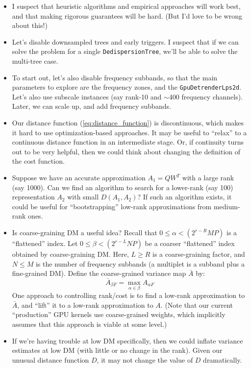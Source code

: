 \documentclass{article}
\numberwithin{equation}{section}   %
\begin{document}
\begin{itemize}

\item I suspect that heuristic algorithms and empirical approaches will
 work best, and that making rigorous guarantees will be hard. (But I'd love to
 be wrong about this!)

\item Let's disable downsampled trees and early triggers. I suspect that
 if we can solve the problem for a single {\tt DedispersionTree}, we'll
 be able to solve the multi-tree case.

\item To start out, let's also disable frequency subbands, so that the
 main parameters to explore are the frequency zones, and the {\tt GpuDetrenderLps2d}.
 Let's also use subscale instances (say rank-10 and $\sim$400 frequency channels).
 Later, we can scale up, and add frequency subbands.

\item Our distance function (\ref{eq:distance_function}) is discontinuous,
 which makes it hard to use optimization-based approaches. It may be useful to
 ``relax'' to a continuous distance function in an intermediate stage. Or, if
 continuity turns out to be very helpful, then we could think about changing
 the definition of the cost function.

\item Suppose we have an accurate approximation $A_1 = Q W^T$ with
 a large rank (say 1000). Can we find an algorithm to search for a lower-rank
 (say 100) representation $A_2$ with small $D(A_1,A_2)$? If such an algorithm
 exists, it could be useful for ``bootstrapping'' low-rank approximations from
 medium-rank ones.

\item Is coarse-graining DM a useful idea? Recall that $0 \le \alpha < (2^{r-R}MP)$
is a ``flattened'' index. Let $0\le \beta < (2^{r-L}NP)$ be a coarser ``flattened''
index obtained by coarse-graining DM. Here, $L \ge R$ is a coarse-graining factor, 
and $N \le M$ is the number of frequency subbands (a multiplet is a subband plus
a fine-grained DM). Define the coarse-grained variance map $\bar A$ by:
\begin{equation}
\bar A_{\beta F} = \max_{\alpha\in\beta} A_{\alpha F}
\end{equation}
One approach to controlling rank/cost is to find a low-rank approximation to $\bar A$, 
and ``lift'' it to a low-rank approximation to $A$. (Note that our current ``production''
GPU kernels use coarse-grained weights, which implicitly assumes that this approach is
viable at some level.)

\item If we're having trouble at low DM specifically, then we could inflate variance
estimates at low DM (with little or no change in the rank). Given our unusual distance
function $D$, it may not change the value of $D$ dramatically.

\end{itemize}
\end{document}
